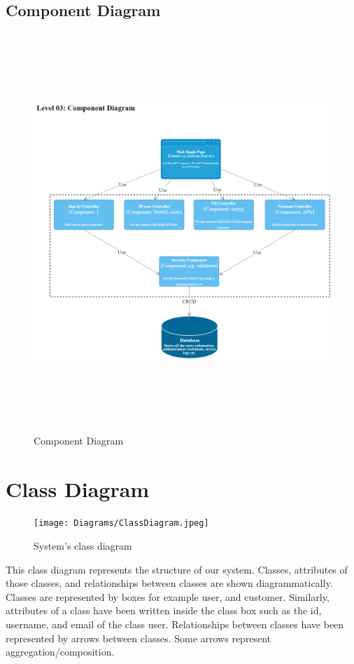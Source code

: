 \subsection{Component  Diagram}
\begin{figure}[H]
    \centering
    \includegraphics[width=14cm,height=15cm]{Figures/Diagrams/ArchitecturalDiagram/ComponentDiagram.png}
    \caption{Component Diagram}
    \label{Component Diagram}
\end{figure}
\section{Class Diagram}
\begin{figure}[H]
    \centering
    \texttt{[image: Diagrams/ClassDiagram.jpeg]}
    \caption{System’s class diagram}
    \label{fig: System’s class diagram}
\end{figure}
\justifying
This class diagram represents the structure of our system. Classes, attributes of those classes, and relationships between classes are shown diagrammatically. Classes are represented by boxes for example user, and customer. Similarly, attributes of a class have been written inside the class box such as the id, username, and email of the class user. Relationships between classes have been represented by arrows between classes. Some arrows represent aggregation/composition.
